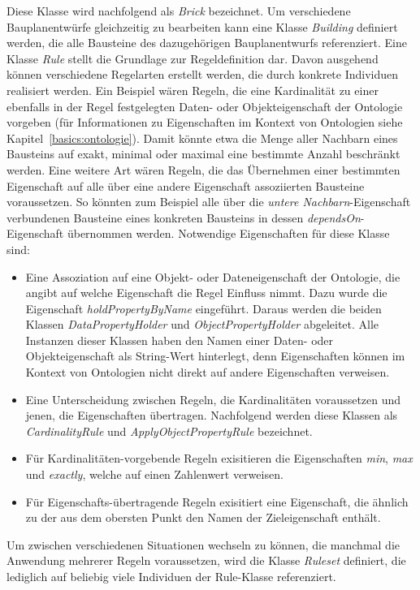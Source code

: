 Diese Klasse wird nachfolgend als \textit{Brick} bezeichnet.
Um verschiedene Bauplanentwürfe gleichzeitig zu bearbeiten kann eine Klasse \textit{Building} definiert werden, die alle Bausteine des dazugehörigen Bauplanentwurfs referenziert.
Eine Klasse \textit{Rule} stellt die Grundlage zur Regeldefinition dar.
Davon ausgehend können verschiedene Regelarten erstellt werden, die durch konkrete Individuen realisiert werden.
Ein Beispiel wären Regeln, die eine Kardinalität zu einer ebenfalls in der Regel festgelegten Daten- oder Objekteigenschaft der Ontologie vorgeben (für Informationen zu Eigenschaften im Kontext von Ontologien siehe Kapitel~\ref{basics:ontologie}).
Damit könnte etwa die Menge aller Nachbarn eines Bausteins auf exakt, minimal oder maximal eine bestimmte Anzahl beschränkt werden.
Eine weitere Art wären Regeln, die das Übernehmen einer bestimmten Eigenschaft auf alle über eine andere Eigenschaft assoziierten Bausteine voraussetzen.
So könnten zum Beispiel alle über die \textit{untere Nachbarn}-Eigenschaft verbundenen Bausteine eines konkreten Bausteins in dessen \textit{dependsOn}-Eigenschaft übernommen werden.
Notwendige Eigenschaften für diese Klasse sind:
\begin{itemize}
  \item Eine Assoziation auf eine Objekt- oder Dateneigenschaft der Ontologie, die angibt auf welche Eigenschaft die Regel Einfluss nimmt. 
  Dazu wurde die Eigenschaft \textit{holdPropertyByName} eingeführt. 
  Daraus werden die beiden Klassen \textit{DataPropertyHolder} und \textit{ObjectPropertyHolder} abgeleitet. 
  Alle Instanzen dieser Klassen haben den Namen einer Daten- oder Objekteigenschaft als String-Wert hinterlegt, denn Eigenschaften können im Kontext von Ontologien nicht direkt auf andere Eigenschaften verweisen.
  \item Eine Unterscheidung zwischen Regeln, die Kardinalitäten voraussetzen und jenen, die Eigenschaften übertragen. 
  Nachfolgend werden diese Klassen als \textit{CardinalityRule} und \textit{ApplyObjectPropertyRule} bezeichnet.
  \item Für Kardinalitäten-vorgebende Regeln exisitieren die Eigenschaften \textit{min}, \textit{max} und \textit{exactly}, welche auf einen Zahlenwert verweisen.
  \item Für Eigenschafts-übertragende Regeln exisitiert eine Eigenschaft, die ähnlich zu der aus dem obersten Punkt den Namen der \glqq{}Zieleigenschaft\grqq{} enthält.
\end{itemize}
Um zwischen verschiedenen Situationen wechseln zu können, die manchmal die Anwendung mehrerer Regeln voraussetzen, wird die Klasse \textit{Ruleset} definiert, die lediglich auf beliebig viele Individuen der Rule-Klasse referenziert.

